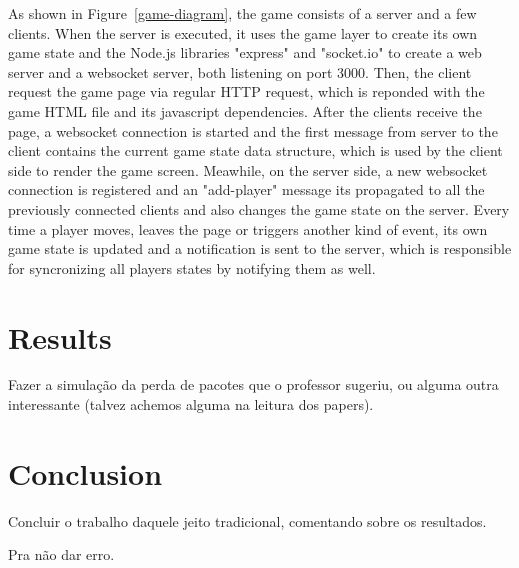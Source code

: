 \documentclass[english]{sbrt}
\begin{document}
As shown in Figure~\ref{game-diagram}, the game consists of a server and a few clients. When the server is executed, it uses the game layer to create its own game state and the Node.js libraries "express" and "socket.io" to create a web server and a websocket server, both listening on port 3000.
Then, the client request the game page via regular HTTP request, which is reponded with the game HTML file and its javascript dependencies. After the clients receive the page, a websocket connection is started and the first message from server to the client contains the current
game state data structure, which is used by the client side to render the game screen. Meawhile, on the server side, a new websocket connection is registered and an "add-player" message its propagated to all the previously connected clients and also changes the game state on the server.
Every time a player moves, leaves the page or triggers another kind of event, its own game state is updated and a notification is sent to the server, which is responsible for syncronizing all players states by notifying them as well.

\section{\textbf{Results}}
Fazer a simulação da perda de pacotes que o professor sugeriu, ou alguma outra interessante (talvez achemos alguma na leitura dos papers).

\section{\textbf{Conclusion}}
Concluir o trabalho daquele jeito tradicional, comentando sobre os resultados.

\cite{maodv01} Pra não dar erro.



\end{document}
